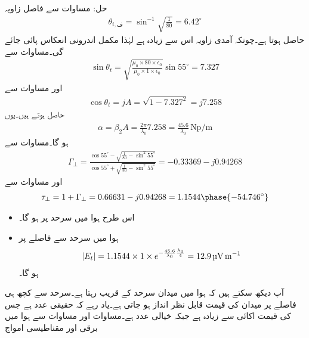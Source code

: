 حل: مساوات  سے فاصل زاویہ
\begin{align*}
\theta_{i,\text{ف}} =\sin^{-1} \sqrt{\frac{1}{80}}=6.42^{\circ}
\end{align*}
حاصل ہوتا ہے۔چونکہ آمدی زاویہ اس سے زیادہ ہے لہٰذا مکمل اندرونی انعکاس پائی جائے گی۔مساوات  سے
\begin{align*}
\sin \theta_t =\sqrt{\frac{\mu_0 \times 80 \times \epsilon_0}{\mu_0 \times 1 \times \epsilon_0}} \sin 55^{\circ}=7.327
\end{align*}
اور مساوات  سے
\begin{align*}
\cos \theta_t =j A= \sqrt{1-7.327^2}=j 7.258
\end{align*} 
حاصل ہوتے ہیں۔یوں
\begin{align*}
\alpha=\beta_2 A =\frac{2\pi}{\lambda_0} 7.258=\frac{45.6}{\lambda_0} \, \si{\neper \per \meter}
\end{align*}
 ہو گا۔مساوات  سے
\begin{align*}
\Gamma_{\perp}=\frac{\cos 55^{\circ} -\sqrt{\frac{1}{80}-\sin^2 55^{\circ}}}{\cos 55^{\circ} +\sqrt{\frac{1}{80}-\sin^2 55^{\circ}}}=-0.33369 - j0.94268
\end{align*}
اور مساوات  سے
\begin{align*}
\tau_{\perp}=1+\Gamma_{\perp}=0.66631- j0.94268=1.1544 \phase{-54.746^{\circ}}
\end{align*}
%
\begin{itemize}
\item
اس طرح ہوا میں سرحد پر   ہو گا۔
\item
ہوا میں سرحد سے  فاصلے پر
\begin{align*}
\abs{E_t}=1.1544\times 1 \times e^{-\frac{45.6}{\lambda_0}\frac{\lambda_0}{4}}=\SI{12.9}{\micro \volt \per \meter}
\end{align*}
ہو گا۔
\end{itemize}

آپ دیکھ سکتے ہیں کہ ہوا میں میدان سرحد کے قریب رہتا ہے۔سرحد سے کچھ ہی فاصلے پر میدان کی قیمت قابل نظر انداز ہو جاتی ہے۔یاد رہے کہ  حقیقی عدد ہے جس کی قیمت اکائی سے زیادہ ہے جبکہ  خیالی عدد ہے۔مساوات  اور مساوات  سے ہوا میں برقی اور مقناطیسی امواج

